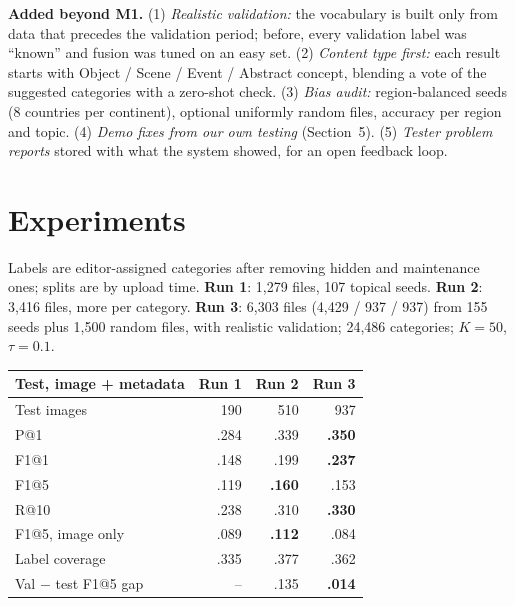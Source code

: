 \documentclass[10pt,twocolumn]{article}
\begin{document}
\vspace{2pt}
\textbf{Added beyond M1.} (1) \emph{Realistic validation:} the vocabulary is built only from data that precedes
the validation period; before, every validation label was ``known'' and fusion was tuned on an easy set.
(2) \emph{Content type first:} each result starts with Object / Scene / Event / Abstract concept, blending a
vote of the suggested categories with a zero-shot check. (3) \emph{Bias audit:} region-balanced seeds
(8 countries per continent), optional uniformly random files, accuracy per region and topic.
(4) \emph{Demo fixes from our own testing} (Section~5). (5) \emph{Tester problem reports} stored with what the
system showed, for an open feedback loop.

\section{Experiments}
Labels are editor-assigned categories after removing hidden and maintenance ones; splits are by upload time.
\textbf{Run 1}: 1,279 files, 107 topical seeds. \textbf{Run 2}: 3,416 files, more per category.
\textbf{Run 3}: 6,303 files (4,429 / 937 / 937) from 155 seeds plus 1,500 random files, with realistic
validation; 24,486 categories; $K{=}50$, $\tau{=}0.1$.

\vspace{2pt}
{\small\centering
\begin{tabular}{@{}lrrr@{}}
\toprule
\textbf{Test, image + metadata} & \textbf{Run 1} & \textbf{Run 2} & \textbf{Run 3} \\ \midrule
Test images & 190 & 510 & 937 \\
P@1 & .284 & .339 & \textbf{.350} \\
F1@1 & .148 & .199 & \textbf{.237} \\
F1@5 & .119 & \textbf{.160} & .153 \\
R@10 & .238 & .310 & \textbf{.330} \\
F1@5, image only & .089 & \textbf{.112} & .084 \\
Label coverage & .335 & .377 & .362 \\
Val $-$ test F1@5 gap & -- & .135 & \textbf{.014} \\ \bottomrule
\end{tabular}\par}
\end{document}
